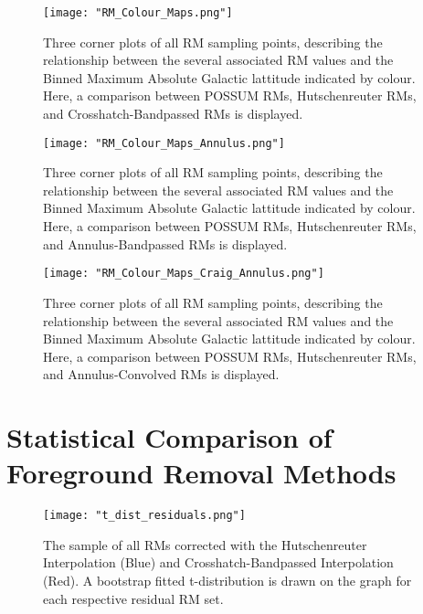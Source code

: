 \begin{figure}
    \texttt{[image: "RM\_Colour\_Maps.png"]}
    \centering
    \caption{Three corner plots of all RM sampling points, describing the relationship between the several associated RM values and the Binned Maximum Absolute Galactic lattitude indicated by colour. Here, a comparison between POSSUM RMs, Hutschenreuter RMs, and Crosshatch-Bandpassed RMs is displayed.}
    \label{fig:colour_maps_1}
\end{figure}

\begin{figure}
    \texttt{[image: "RM\_Colour\_Maps\_Annulus.png"]}
    \centering
    \caption{Three corner plots of all RM sampling points, describing the relationship between the several associated RM values and the Binned Maximum Absolute Galactic lattitude indicated by colour. Here, a comparison between POSSUM RMs, Hutschenreuter RMs, and Annulus-Bandpassed RMs is displayed.}
    \label{fig:colour_maps_2}
\end{figure}

\begin{figure}
    \texttt{[image: "RM\_Colour\_Maps\_Craig\_Annulus.png"]}
    \centering
    \caption{Three corner plots of all RM sampling points, describing the relationship between the several associated RM values and the Binned Maximum Absolute Galactic lattitude indicated by colour. Here, a comparison between POSSUM RMs, Hutschenreuter RMs, and Annulus-Convolved RMs is displayed.}
    \label{fig:colour_maps_3}
\end{figure}


\section{Statistical Comparison of Foreground Removal Methods}
\label{sec:FR_stats}

\begin{figure}
    \texttt{[image: "t\_dist\_residuals.png"]}
    \centering
    \caption{The sample of all RMs corrected with the Hutschenreuter Interpolation (Blue) and Crosshatch-Bandpassed Interpolation (Red). A bootstrap fitted t-distribution is drawn on the graph for each respective residual RM set.}
    \label{fig:t_dist}
\end{figure}

